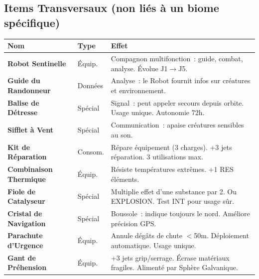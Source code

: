 \documentclass[9pt,a4paper]{article}
\begin{document}
\vspace{8pt}

\subsection*{Items Transversaux (non li\'es \`a un biome sp\'ecifique)}

\noindent\scriptsize
\begin{tabularx}{\linewidth}{|>{\bfseries\centering\arraybackslash}p{2.8cm}|>{\centering\arraybackslash}p{1.6cm}|L|}
\hline
{} \normalfont\textbf{Nom} & \textbf{Type} & \textbf{Effet} \\
\hline
Robot Sentinelle & \'Equip. & Compagnon multifonction~: guide, combat, analyse. \'Evolue J1$\to$J5. \\
\hline
Guide du Randonneur & Donn\'ees & Analyse~: le Robot fournit infos sur cr\'eatures et environnement. \\
\hline
Balise de D\'etresse & Sp\'ecial & Signal~: peut appeler secours depuis orbite. Usage unique. Autonomie 72h. \\
\hline
Sifflet \`a Vent & Sp\'ecial & Communication~: apaise cr\'eatures sensibles au son. \\
\hline
Kit de R\'eparation & Consom. & R\'epare \'equipement (3 charges). +3 jets r\'eparation. 3 utilisations max. \\
\hline
Combinaison Thermique & \'Equip. & R\'esiste temp\'eratures extr\^emes. +1 RES \'el\'ements. \\
\hline
Fiole de Catalyseur & Sp\'ecial & Multiplie effet d'une substance par 2. Ou EXPLOSION. Test INT pour usage s\^ur. \\
\hline
Cristal de Navigation & Sp\'ecial & Boussole~: indique toujours le nord. Am\'eliore pr\'ecision GPS. \\
\hline
Parachute d'Urgence & \'Equip. & Annule d\'eg\^ats de chute $<$50m. D\'eploiement automatique. Usage unique. \\
\hline
Gant de Pr\'ehension & \'Equip. & +3 jets grip/serrage. \'Ecrase mat\'eriaux fragiles. Aliment\'e par Sph\`ere Galvanique. \\
\hline
\end{tabularx}
\end{document}
